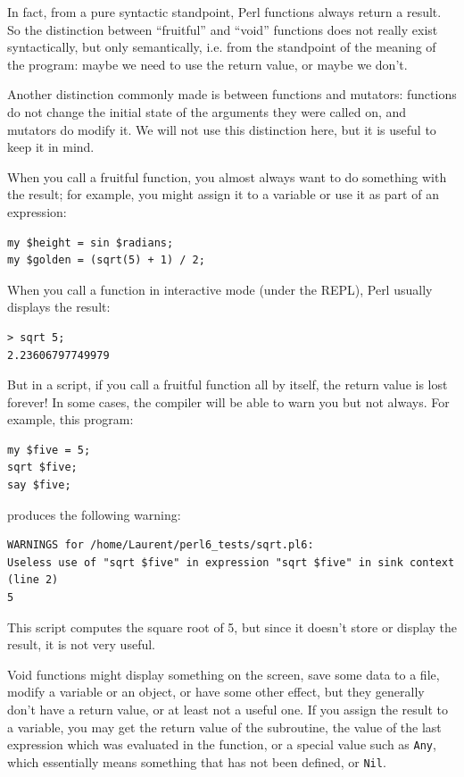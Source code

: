 In fact, from a pure syntactic standpoint, Perl functions 
always return a result. So the distinction between 
``fruitful'' and ``void'' functions does not really exist 
syntactically, but only semantically, i.e. from the 
standpoint of the meaning of the program: maybe we need to 
use the return value, or maybe we don't.

Another distinction commonly made is between functions and 
mutators: functions do not change the initial state of the 
arguments they were called on, and mutators do modify it. We 
will not use this distinction here, but it is useful to 
keep it in mind.

When you call a fruitful function, you almost always
want to do something with the result; for example, you might
assign it to a variable or use it as part of an expression:

\begin{verbatim}
my $height = sin $radians;
my $golden = (sqrt(5) + 1) / 2;
\end{verbatim}
%
When you call a function in interactive mode (under the 
REPL), Perl usually displays the result:

\begin{verbatim}
> sqrt 5;
2.23606797749979
\end{verbatim}
%
But in a script, if you call a fruitful function all by 
itself, the return value is lost forever! In some cases, the 
compiler will be able to warn you but not always. For example, 
this program:

\begin{verbatim}
my $five = 5;
sqrt $five;
say $five;
\end{verbatim}

produces the following warning:

\begin{verbatim}
WARNINGS for /home/Laurent/perl6_tests/sqrt.pl6:
Useless use of "sqrt $five" in expression "sqrt $five" in sink context (line 2)
5
\end{verbatim}
%
This script computes the square root of 5, but since 
it doesn't store or display the result, it is not very useful.

Void functions might display something on the screen, 
save some data to a file, modify a variable or an object, 
or have some other effect, but they generally don't have 
a return value, or at least not a useful one.  If you assign 
the result to a variable, you may get the return value of 
the subroutine, the value of the last expression which was 
evaluated in the function, or a special value such as 
{\tt Any}, which essentially means something that has not 
been defined, or {\tt Nil}.
%

